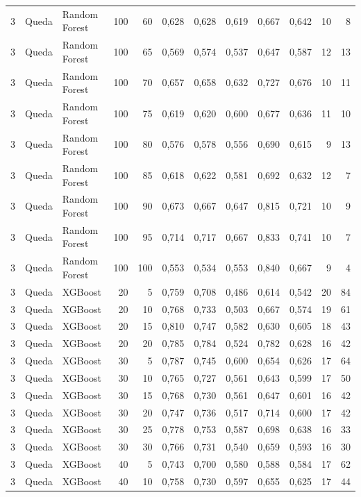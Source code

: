\begin{longtable}{@{}rllrrrrrrrrr@{}}
3 & Queda & Random Forest & 100 & 60 & 0,628 & 0,628 & 0,619 & 0,667 & 0,642 & 10 & 8 \\
3 & Queda & Random Forest & 100 & 65 & 0,569 & 0,574 & 0,537 & 0,647 & 0,587 & 12 & 13 \\
3 & Queda & Random Forest & 100 & 70 & 0,657 & 0,658 & 0,632 & 0,727 & 0,676 & 10 & 11 \\
3 & Queda & Random Forest & 100 & 75 & 0,619 & 0,620 & 0,600 & 0,677 & 0,636 & 11 & 10 \\
3 & Queda & Random Forest & 100 & 80 & 0,576 & 0,578 & 0,556 & 0,690 & 0,615 & 9 & 13 \\
3 & Queda & Random Forest & 100 & 85 & 0,618 & 0,622 & 0,581 & 0,692 & 0,632 & 12 & 7 \\
3 & Queda & Random Forest & 100 & 90 & 0,673 & 0,667 & 0,647 & 0,815 & 0,721 & 10 & 9 \\
3 & Queda & Random Forest & 100 & 95 & 0,714 & 0,717 & 0,667 & 0,833 & 0,741 & 10 & 7 \\
3 & Queda & Random Forest & 100 & 100 & 0,553 & 0,534 & 0,553 & 0,840 & 0,667 & 9 & 4 \\
3 & Queda & XGBoost & 20 & 5 & 0,759 & 0,708 & 0,486 & 0,614 & 0,542 & 20 & 84 \\
3 & Queda & XGBoost & 20 & 10 & 0,768 & 0,733 & 0,503 & 0,667 & 0,574 & 19 & 61 \\
3 & Queda & XGBoost & 20 & 15 & 0,810 & 0,747 & 0,582 & 0,630 & 0,605 & 18 & 43 \\
3 & Queda & XGBoost & 20 & 20 & 0,785 & 0,784 & 0,524 & 0,782 & 0,628 & 16 & 42 \\
3 & Queda & XGBoost & 30 & 5 & 0,787 & 0,745 & 0,600 & 0,654 & 0,626 & 17 & 64 \\
3 & Queda & XGBoost & 30 & 10 & 0,765 & 0,727 & 0,561 & 0,643 & 0,599 & 17 & 50 \\
3 & Queda & XGBoost & 30 & 15 & 0,768 & 0,730 & 0,561 & 0,647 & 0,601 & 16 & 42 \\
3 & Queda & XGBoost & 30 & 20 & 0,747 & 0,736 & 0,517 & 0,714 & 0,600 & 17 & 42 \\
3 & Queda & XGBoost & 30 & 25 & 0,778 & 0,753 & 0,587 & 0,698 & 0,638 & 16 & 33 \\
3 & Queda & XGBoost & 30 & 30 & 0,766 & 0,731 & 0,540 & 0,659 & 0,593 & 16 & 30 \\
3 & Queda & XGBoost & 40 & 5 & 0,743 & 0,700 & 0,580 & 0,588 & 0,584 & 17 & 62 \\
3 & Queda & XGBoost & 40 & 10 & 0,758 & 0,730 & 0,597 & 0,655 & 0,625 & 17 & 44 \\

\end{longtable}

